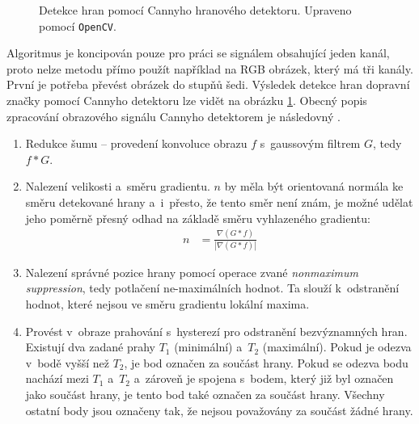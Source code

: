 \begin{figure}[H]
    \centering
    \hfill
    \caption{Detekce hran pomocí Cannyho hranového detektoru. Upraveno pomocí \texttt{OpenCV}.}
    \label{fig:canny}
\end{figure}


Algoritmus je koncipován pouze pro práci se signálem obsahující jeden kanál, proto nelze metodu přímo použít například na RGB obrázek, který má tři kanály. První je potřeba převést obrázek do stupňů šedi. Výsledek detekce hran dopravní značky pomocí Cannyho detektoru lze vidět na obrázku \ref{fig:canny}. Obecný popis zpracování obrazového signálu Cannyho detektorem je následovný \cite{canny, tsRychlaDetekce, tsWindowsPhone}.

\begin{enumerate}
    \item Redukce šumu  -- provedení konvoluce obrazu $f$ s~gaussovým filtrem $G$, tedy $f * G$.
    \item Nalezení velikosti a~směru gradientu. $n$ by měla být orientovaná normála ke směru detekované hrany a~i~přesto, že tento směr není znám, je možné udělat jeho poměrně přesný odhad na základě směru vyhlazeného gradientu:
    \begin{align}
        \label{eq:soustavaCanny}
        n &= \frac{\nabla(G * f)}{|\nabla(G * f)|}
    \end{align}
    \item Nalezení správné pozice hrany pomocí operace zvané \emph{nonmaximum suppression}, tedy potlačení ne-maximálních hodnot. Ta slouží k~odstranění hodnot, které nejsou ve směru gradientu lokální maxima.
    \item Provést v~obraze prahování s~hysterezí pro odstranění bezvýznamných hran. Existují dva zadané prahy $T_1$ (minimální) a~$T_2$ (maximální). Pokud je odezva v~bodě vyšší než $T_2$, je bod označen za součást hrany. Pokud se odezva bodu nachází mezi $T_1$ a~$T_2$ a~zároveň je spojena s~bodem, který již byl označen jako součást hrany, je tento bod také označen za součást hrany. Všechny ostatní body jsou označeny tak, že nejsou považovány za součást žádné hrany.
\end{enumerate}

